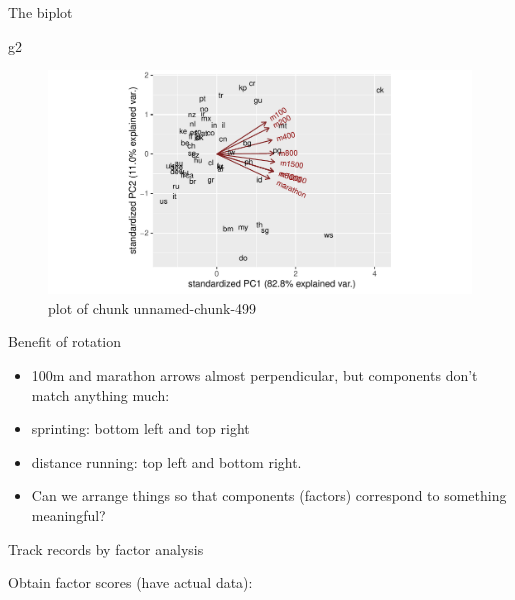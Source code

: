 \documentclass[ignorenonframetext,]{beamer}
\newenvironment{Shaded}{\begin{snugshade}}{\end{snugshade}}
\newcommand{\DataTypeTok}[1]{\textcolor[rgb]{0.13,0.29,0.53}{#1}}
\newcommand{\DecValTok}[1]{\textcolor[rgb]{0.00,0.00,0.81}{#1}}
\newcommand{\KeywordTok}[1]{\textcolor[rgb]{0.13,0.29,0.53}{\textbf{#1}}}
\newcommand{\NormalTok}[1]{#1}
\newcommand{\OperatorTok}[1]{\textcolor[rgb]{0.81,0.36,0.00}{\textbf{#1}}}
\newcommand{\StringTok}[1]{\textcolor[rgb]{0.31,0.60,0.02}{#1}}
\begin{document}
\begin{frame}[fragile]{The biplot}
\protect\hypertarget{the-biplot-2}{}

\begin{Shaded}
\begin{Highlighting}[]
\NormalTok{g2}
\end{Highlighting}
\end{Shaded}

\begin{figure}
\centering
\includegraphics{figure/unnamed-chunk-499-1.pdf}
\caption{plot of chunk unnamed-chunk-499}
\end{figure}

\end{frame}

\begin{frame}{Benefit of rotation}
\protect\hypertarget{benefit-of-rotation}{}

\begin{itemize}
\item
  100m and marathon arrows almost perpendicular, but components don't
  match anything much:
\item
  sprinting: bottom left and top right
\item
  distance running: top left and bottom right.
\item
  Can we arrange things so that components (factors) correspond to
  something meaningful?
\end{itemize}

\end{frame}

\begin{frame}[fragile]{Track records by factor analysis}
\protect\hypertarget{track-records-by-factor-analysis}{}

Obtain factor scores (have actual data):

\normalsize

\begin{Shaded}
\end{Shaded}

\normalsize

\end{frame}
\end{document}
